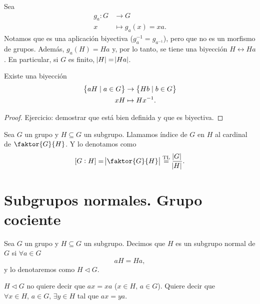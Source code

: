 \begin{obs}
    Sea
    \[
        \begin{aligned}
            g_a \colon G &\to G \\
            x &\mapsto g_a(x) = xa.
        \end{aligned}
    \]
    Notamos que es una aplicación biyectiva ($g^{-1}_a = g_{a^{-1}}$), pero que no es un morfismo de grupos.
    Además, $g_a(H) = Ha$ y, por lo tanto, se tiene una biyección $H \leftrightarrow Ha$. En particular, si
    $G$ es finito, $\abs{H} = \abs{Ha}$.
\end{obs}

\begin{prop}
    Existe una biyección
    \[
        \begin{aligned}
            \left\{aH \mid a \in G\right\} &\to \left\{Hb \mid b \in G\right\} \\
            xH &\mapsto Hx^{-1}.
        \end{aligned}
    \]
\end{prop}

\begin{proof}
    Ejercicio: demostrar que está bien definida y que es biyectiva.
\end{proof}

\begin{defi}
    Sea $G$ un grupo y $H \subseteq G$ un subgrupo. Llamamos índice de $G$ en $H$ al cardinal de $\faktor{G}{H}$.
    Y lo denotamos como
    \[
        \left[G : H \right] = \abs{\faktor{G}{H}} \stackrel{\text{TL}}{=} \frac{\abs{G}}{\abs{H}}.
    \]
\end{defi}

\section{Subgrupos normales. Grupo cociente}

\begin{defi}
    Sea $G$ un grupo y $H \subseteq G$ un subgrupo. Decimos que $H$ es un subgrupo normal de $G$ si
    $\forall a \in G$
    \[
        aH = Ha,
    \]
    y lo denotaremos como $H \triangleleft G$.
\end{defi}

\begin{obs}
    $H \triangleleft G$ no quiere decir que $ax = xa$ ($x \in H, \, a \in G$). Quiere decir que
    $\forall x \in H, \, a \in G, \, \exists y \in H$ tal que $ax = ya$.
\end{obs}

